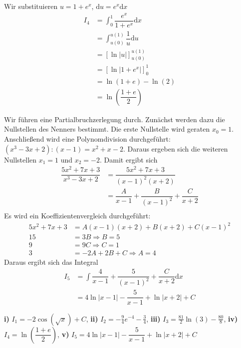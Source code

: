 {\begin{iii}
\item  Wir substituieren $u=1+e^x$, $\mathrm{d} u = e^x \mathrm{d} x$
\begin{align*}
I_4 &= \int_0^1 \dfrac{e^x}{1+e^x}\mathrm{d} x \\
&=\int_{u(0)}^{u(1)} \dfrac{1}{u} \mathrm{d} u \\
&= \left[ \ln|u|\right]_{u(0)}^{u(1)} \\
&=  \left[ \ln|1+e^x|\right]_0^1 \\
&= \ln(1+e) - \ln(2) \\
&= \ln \left( \dfrac{1+e}{2}\right) 
\end{align*}

\item Wir f\"uhren eine Partialbruchzerlegung durch. Zun\"achst werden dazu die Nullstellen des Nenners bestimmt. Die erste Nullstelle wird geraten $x_0 =1$. Anschließend wird eine Polynomdivision durchgef\"uhrt:
$(x^3-3x+2):(x-1)=x^2+x-2$. Daraus ergeben sich die weiteren Nullstellen $x_1 = 1$ und $x_2 =-2$. Damit ergibt sich
\begin{align*}
 \dfrac{5x^2+7x+3}{x^3-3x+2} &=  \dfrac{5x^2+7x+3}{(x-1)^2(x+2)}  \\
 &= \dfrac{A}{x-1} + \dfrac{B}{(x-1)^2} + \dfrac{C}{x+2} \\
\end{align*}
Es wird ein Koeffizientenvergleich durchgef\"uhrt:
\begin{align*}
5x^2+7x+3 &= A(x-1)(x+2) +B(x+2)+C(x-1)^2 \\
15 &= 3B \Rightarrow B=5 \\
9 &= 9C \Rightarrow C =1 \\
3 &= -2A+2B+C \Rightarrow A =4
\end{align*}
Daraus ergibt sich das Integral
\begin{align*}
I_5 &= \int \dfrac{4}{x-1} + \dfrac{5}{(x-1)^2} + \dfrac{C}{x+2}  \mathrm{d} x \\
&= 4 \ln|x-1| - \dfrac{5}{x-1} + \ln|x+2| + C
\end{align*}
\end{iii}
}

{
{{\textbf{i)}} $I_1 =-2\cos(\sqrt{x}) +C$, {\textbf{ii)}} $ I_2=-\frac{9}{4}e^{-4}-\frac{3}{4}$, {\textbf{iii)}} $I_3=\frac{81}{2} \ln(3) - \frac{80}{8}$, {\textbf{iv)}} $I_4=\ln \left( \dfrac{1+e}{2}\right)$, {\textbf{v)}} $I_5= 4 \ln|x-1| - \dfrac{5}{x-1} + \ln|x+2| + C$
}
}


